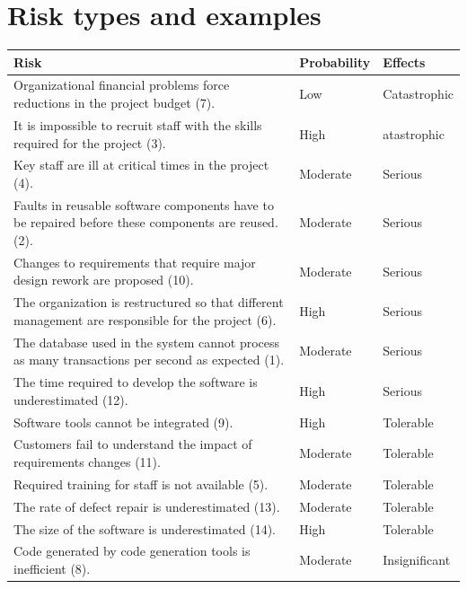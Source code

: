 \section{ Risk types and examples}
\begin{table}[h!]
\centering
\begin{tabular}{ |p{7cm}|p{2cm}|p{2cm}|  }
\hline
Risk & Probability &  Effects\\
\hline
\hline
Organizational financial problems force reductions in the project budget (7). & Low & Catastrophic\\
\hline
It is impossible to recruit staff with the skills required for the project (3). & High & atastrophic\\
\hline
Key staff are ill at critical times in the project (4). & Moderate & Serious\\
\hline
Faults in reusable software components have to be repaired before these components are reused. (2). & Moderate & Serious\\
\hline
Changes to requirements that require major design rework are proposed (10). & Moderate & Serious\\
\hline
The	organization	is	restructured	so	that	different management are responsible for the project (6). & High & Serious\\
\hline
The database used in the system cannot process as many transactions per second as expected (1). & Moderate & Serious\\
\hline
The	time	required	to	develop	the	software	is underestimated (12). & High & Serious\\
\hline
Software tools cannot be integrated (9). & High & Tolerable\\
\hline
Customers fail to understand the impact of requirements changes (11). & Moderate & Tolerable\\
\hline
Required training for staff is not available (5). & Moderate & Tolerable\\
\hline
The rate of defect repair is underestimated (13). & Moderate & Tolerable\\
\hline
The size of the software is underestimated (14). & High & Tolerable\\
\hline
Code generated by code generation tools is inefficient (8). & Moderate & Insignificant\\
\hline

\end{tabular}

\label{table:T5_2}
\end{table}


